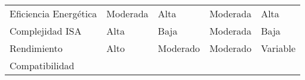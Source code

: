 \documentclass[12pt,twoside]{templates/unerthesis}
\begin{document}
\begin{longtable}[]{@{}lllll@{}}
\begin{minipage}[t]{0.17\columnwidth}
Eficiencia Energética\strut
\end{minipage} & \begin{minipage}[t]{0.18\columnwidth}\raggedright
Moderada\strut
\end{minipage} & \begin{minipage}[t]{0.16\columnwidth}\raggedright
Alta\strut
\end{minipage} & \begin{minipage}[t]{0.15\columnwidth}\raggedright
Moderada\strut
\end{minipage} & \begin{minipage}[t]{0.20\columnwidth}\raggedright
Alta\strut
\end{minipage}\tabularnewline
\begin{minipage}[t]{0.17\columnwidth}\raggedright
Complejidad ISA\strut
\end{minipage} & \begin{minipage}[t]{0.18\columnwidth}\raggedright
Alta\strut
\end{minipage} & \begin{minipage}[t]{0.16\columnwidth}\raggedright
Baja\strut
\end{minipage} & \begin{minipage}[t]{0.15\columnwidth}\raggedright
Moderada\strut
\end{minipage} & \begin{minipage}[t]{0.20\columnwidth}\raggedright
Baja\strut
\end{minipage}\tabularnewline
\begin{minipage}[t]{0.17\columnwidth}\raggedright
Rendimiento\strut
\end{minipage} & \begin{minipage}[t]{0.18\columnwidth}\raggedright
Alto\strut
\end{minipage} & \begin{minipage}[t]{0.16\columnwidth}\raggedright
Moderado\strut
\end{minipage} & \begin{minipage}[t]{0.15\columnwidth}\raggedright
Moderado\strut
\end{minipage} & \begin{minipage}[t]{0.20\columnwidth}\raggedright
Variable\strut
\end{minipage}\tabularnewline
\begin{minipage}[t]{0.17\columnwidth}\raggedright
Compatibilidad\strut
\end{minipage} & \begin{minipage}[t]{0.18\columnwidth}\raggedright

\end{minipage}
\end{longtable}
\end{document}
